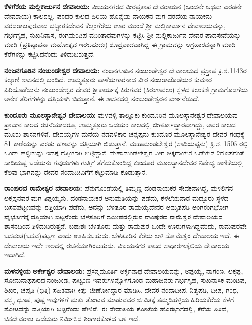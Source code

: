 \textbf{ಕೆಳಗೆರೆಯ ಮಲ್ಲಿಕಾರ್ಜುನ ದೇವಾಲಯ: } ವಿಜಯನಗರದ ವೀರಪ್ರತಾಪ ದೇವರಾಯನ (ಒಂದನೇ ಅಥವಾ ಎರಡನೇ ದೇವರಾಯ) ಕಾಲದಲ್ಲಿ, ಪರದರ ಕುಲದ ಹಿರಿಯ ಹೊನ್ನೆಯ ನಾಯಕನ ಮಗ ವರದೆಯ ನಾಯಕನು ವರದರಾಜಪುರವಾದ ಭಟ್ಟಾರಕದೇವನ ಕೆಲ್ಲಂಗೆರೆಯ ಊರ ಮುಂದೆ ಶ‍್ರೀ ಮಲ್ಲಿಕಾರ್ಜುನ ದೇವಾಲಯವನ್ನು, ಗರ್ಭಗೃಹ, ಸುಖನಿವಾಸ, ರಂಗಮಂಟಪ ಮುಂತಾದವುಗಳನ್ನು ಕಟ್ಟಿಸಿ ಶ‍್ರೀ ಮಲ್ಲಿಕಾರ್ಜುನ ದೇವರ ಪಾದಸೇವೆಯನ್ನು ಮಾಡಿ (ಪ್ರತಿಷ್ಠಾಪನಾ ಮಹೋತ್ಸವ ಇರಬಹುದು) ಶೂದ್ರವಾಡವಾಗಿದ್ದ ಈ ಗ್ರಾಮವನ್ನು ಅಗ್ರಹಾರವನ್ನಾಗಿ ಮಾಡಿ ಕೆರೆಗಳನ್ನು ಕಟ್ಟಿಸಿದನೆಂದು ತಿಳಿದುಬರುತ್ತದೆ.

\textbf{ನಂಜನಗೂಡಿನ ನಂಜುಂಡೇಶ್ವರ ದೇವಾಲಯ:} ನಂಜನಗೂಡಿನ ನಂಜುಂಡೇಶ್ವರ ದೇವಾಲಯದ ಪ್ರಸ್ತಾಪ ಕ್ರಿ.ಶ.1143ರ ಕಲ್ಕುಣಿ ಶಾಸನದಲ್ಲಿ ಬಂದಿದೆ. ಉಮ್ಮತ್ತೂರು ಪಾಳೆಯಗಾರನಾದ ವೀರ ನಂಜರಾಜೊಡೆಯರ ಕುಮಾರ ಪಿರಿಯೊಡೆಯನು ನಂಜುಂಡೇಶ್ವರ ದೇವರ ಶ‍್ರೀಕಾರ್ಯಕ್ಕೆ ಕಿರುಗವರ (ಕಿರುಗಾವಲು) ಸ್ಥಳದ ಕಲುಕಣಿ ಗ್ರಾಮಗೊಡಗೆಯ ಅನೇಕ ತೆರಿಗೆಗಳನ್ನು ದತ್ತಿಯಾಗಿ ಬಿಡುತ್ತಾನೆ. ಈ ಶಾಸನದಲ್ಲಿ ನಂಜುಂಡೇಶ್ವರನ ವರ್ಣನೆಯಿದೆ.

\textbf{ಕುಂದೂರು ಮೂಲಸ್ಥಾನೇಶ್ವರ ದೇವಾಲಯ:} ಮಳವಳ್ಳಿ ತಾಲ್ಲೂಕು ಕುಂದೂರಿನ ಮೂಲಸ್ಥಾನೇಶ್ವರ ದೇವಾಲಯವು ಪ್ರಾಚೀನ ಕಾಲದ ರಚನೆಯಾದರೂ, ಉಮ್ಮತ್ತೂರು ಒಡೆಯರ ಕಾಲದಲ್ಲಿ ಜೀರ್ಣೋದ್ಧಾರವಾಗಿದ್ದು, ಅವರ ಕಾಲದ ಮೂರು ಶಾಸನಗಳಿವೆ. ದೇವಯ್ಯಗಳ ಮನೆಯ ನಡವಳಿಕಾರ ಚನ್ನಪ್ಪನು ಕುಂದೂರ ಮೂಲಸ್ಥಾನೇಶ್ವರ ದೇವರ ಗಂಧಕ್ಕೆ 81 ಕಾಣಿಯನ್ನು ಎರಡು ಹಣವನ್ನು ದತ್ತಿಯಾಗಿ ಬಿಡುತ್ತಾನೆ. ಮಹಾಮಂಡಲೇಶ್ವರ (ಸಾದಿಯಪ್ಪನು) ಕ್ರಿ.ಶ. 1505 ರಲ್ಲಿ ಒಂದು ಹಳ್ಳಿಯನ್ನು ಇದಕ್ಕೆ ದತ್ತಿಯಾಗಿ ಬಿಟ್ಟಿದ್ದಾನೆ. ಮಹಾಮಂಡಲೇಶ್ವರ ವೀರ ಚಿಕ್ಕರಾಯನ ಒಡೆಯನ ನಿರೂಪದಂತೆ ಸಾದಿಯಪ್ಪ ಒಡೆಯನು ಗವುಡುಗಳು ಗುತ್ತಿಗೆ ತೆಗೆದುಕೊಂಡಿದ್ದ ಕುಂದೂರ ಮೂಲಸ್ಥಾನದೇವರ ನಿವೇದ್ಯ ಕಾಣಿಕೆಯಲ್ಲಿ ಕೆಲವು ಭಾಗವನ್ನು ದೇವರ ನಂದಾದೀವಿಗೆಗೆ ಕಟ್ಟುಮಾಡಿ ಕೊಡುತ್ತಾನೆ.

\textbf{ರಾಂಪುರದ ರಾಮೇಶ್ವರ ದೇವಾಲಯ:} ಪೆನುಗೊಂಡೆಯಲ್ಲಿ ತಿಮ್ಮಣ್ಣ ದಂಡನಾಯಕರ ಸೇವಕನಾಗಿದ್ದ, ಮಳಲಿಗನ ಲಕ್ಕಪ್ಪನವರ ಮಗ ತಿಪ್ಪಯ್ಯನು, ದಂಡನಾಯಕರ ಅನುಮತಿಯನ್ನು ಪಡೆದು, ಕೆಳಲೆಯನಾಡ ಮದ್ದೂರು ಸ್ಥಳದ ಬಸವಪಟ್ಟಣವನ್ನು ದತ್ತಿಯಾಗಿ ಪಡೆದು, ಅದನ್ನು ಬೆಳತೂರ ರಾಮಯ್ಯದೇವರ ಅಮೃತಪಡಿ ಅಂಗರಂಗಭೋಗ ವೈಭೋಗಕ್ಕೆ ದತ್ತಿಯಾಗಿ ಬಿಟ್ಟನೆಂದು ಬೆಳತೂರಿಗೆ ಸಮೀಪದಲ್ಲಿರುವ ರಾಂಪುರದ ರಾಮೆಶ್ವರ ದೇವಾಲಯದ ಶಾಸನದಿಂದ ತಿಳಿದುಬರುತ್ತದೆ. ಬಹುಶಃ ಬೆಳತೂರು ಮತ್ತು ರಾಮಪುರ ಒಂದೇ ಊರುಗಳಾಗಿದ್ದವೆಂದು, ರಾಮಪುರವೇ ಬಸವಂತ(ಬಸವ)ಪಟ್ಟಣ ಎಂದು ಊಹಿಸಬಹುದು. ಬೆಳತೂರಿನ ಕೆರೆಯ ಬಳಿ ಸೋಮೆಶ್ವರ ದೇವಾಲಯ ಇದೆ. ಈ ದೇವಾಲಯ ಇದೇ ಕಾಲದಲ್ಲಿ ರಚನೆಯಾಗಿರಬಹುದು. ವಿಜಯನಗರ ಕಾಲದ ಸಾಧಾರಣಶೈಲಿಯ ದೇವಾಲಯ ಇದಾಗಿದೆ.

\textbf{ಮಳವಳ್ಳಿಯ ಅರ್ಕೇಶ್ವರ ದೇವಾಲಯ:} ಪ್ರಸನ್ನಮೂರ್ತಿ ಅರ್ಕ್ಕನಾಥ ದೇವಾಲಯವನ್ನು, ಅಪ್ಪಯ್ಯ, ನಾಗಂಣ, ಲಕ್ಕಪ್ಪ, ಸೋಮನಾಥಪುರದ ನಂಜುಂಡ, ಪುಟ್ಟಂಣ ಇವರುಗಳನ್ನೊಳಗೊಂಡ ಮಹಾಜನರು ಗರ್ಭಗೃಹ, ಸುಖನಾಸಿಕ ಮಂಟಪ, ಶಿಖರ, ಚಪ್ಪಡಿ (ಭಿತ್ತಿ) ಸಹಿತವಾಗಿ ಕಿತ್ತು ಜೀರ್ಣೋದ್ಧಾರ ಮಾಡಿಸಿ, ದೇವರ ನಂದಾದೀಪ, ನಿತ್ಯಪಡಿ, ದೀಪ, ಗಂಧ, ವಸ್ತ್ರ, ಧೂಪ, ಪುಷ್ಪ ಇವುಗಳಿಗೆ ಮತ್ತು ತೋಟವ ಮಾಡುವವರ ಜೀವಿತಕ್ಕೆ ತಮ್ಮಡಿಹಳ್ಳಿಯ ಹಿರಿಯಕೆರೆಯ ಕೆಳಗೆ ತೋಟವನ್ನು ದತ್ತಿಯಾಗಿ ಬಿಟ್ಟರೆಂದು ಹೇಳಿದೆ. ಈ ದೇವಾಲಯ ಕೋಟೆಯ ಹೊರಭಾಗದಲ್ಲಿ, ಕೆರೆಯ ಹಿಂದೆ, ಚಿಕದೇವರಾಜ ಒಡೆಯರು ನಿರ್ಮಿಸಿದ ಶಿಂಗಾರಕೊಳದ ಬಳಿ ಇದೆ.

